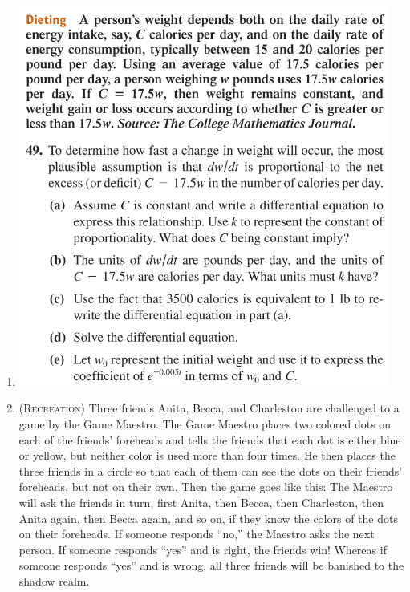 \begin{enumerate}
    \item 
        \begin{center}
            \includegraphics[width=0.96\textwidth]{screenshots/49.png}
        \end{center}

    \item 
        (\textsc{Recreation})
        Three friends Anita, Becca, and Charleston 
        are challenged to a game by the Game Maestro.
        The Game Maestro places two colored dots 
        on each of the friends' foreheads
        and tells the friends that each dot is either blue or yellow,
        but neither color is used more than four times.
        He then places the three friends in a circle so that each of them
        can see the dots on their friends' foreheads, but not on their own.
        Then the game goes like this:
        The Maestro will ask the friends in turn, 
        first Anita, then Becca, then Charleston, then Anita again, 
        then Becca again, and so on, 
        if they know the colors of the dots on their foreheads.
        If someone responds ``no,'' the Maestro asks the next person.
        If someone responds ``yes'' and is right, the friends win!
        Whereas if someone responds ``yes'' and is wrong, 
        all three friends will be banished to the shadow realm.


\end{enumerate}
